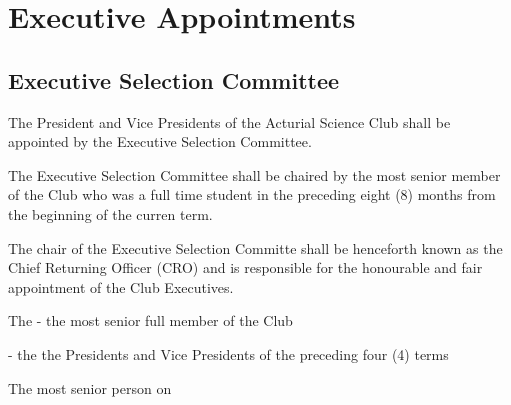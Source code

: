 \section{Executive Appointments}

\subsection{Executive Selection Committee}
The President and Vice Presidents of the Acturial Science Club shall be appointed
by the Executive Selection Committee. 

The Executive Selection Committee shall be
chaired by the most senior member of the Club who was a full time student in
the preceding eight (8) months from the beginning of the curren term. 

The chair of the Executive Selection Committe shall be henceforth known as the
Chief Returning Officer (CRO) and is responsible for the honourable and fair
appointment of the Club Executives.

The 
- the most senior full member of the Club  
    

- the the Presidents and Vice Presidents of the preceding four (4) terms 


The most senior person on 
